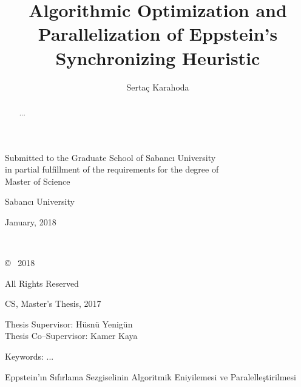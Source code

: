 \documentclass[12pt]{article}
\title{Algorithmic Optimization and Parallelization of Eppstein's Synchronizing Heuristic}
\author{Serta\c{c} Karahoda}
\date{}
\begin{document}
\maketitle
\thispagestyle{empty}
\vspace{1cm}

\begin{center}
Submitted to the Graduate School of Sabanc{\i} University \\
in partial fulfillment of the requirements for the degree of \\
Master of Science
\end{center}

\vspace{2cm}

\begin{center}
Sabanc{\i} University
\end{center}

\begin{center}
January, 2018
\end{center}


\clearpage
$ $
\thispagestyle{empty}
\clearpage
$ $
\vspace{5cm}
\begin{center}
\copyright \hspace{0.1cm} \MyAuthor\ 2018

All Rights Reserved
\thispagestyle{empty}
\end{center}
\clearpage

\begin{center}
\large
\MyTitle
\end{center}

\begin{center}
\MyAuthor

CS, Master's Thesis, 2017

Thesis Supervisor: H\"{u}sn\"{u} Yenig\"{u}n\\
Thesis Co--Supervisor: Kamer Kaya
\end{center}

\begin{center}
Keywords: ...
\end{center}

\begin{abstract}
...
\end{abstract}
\clearpage

\begin{center}
\large
Eppstein'{\i}n S{\i}f{\i}rlama Sezgiselinin Algoritmik Eniyilemesi ve Paralelle\c{s}tirilmesi
\end{center}
\end{document}

